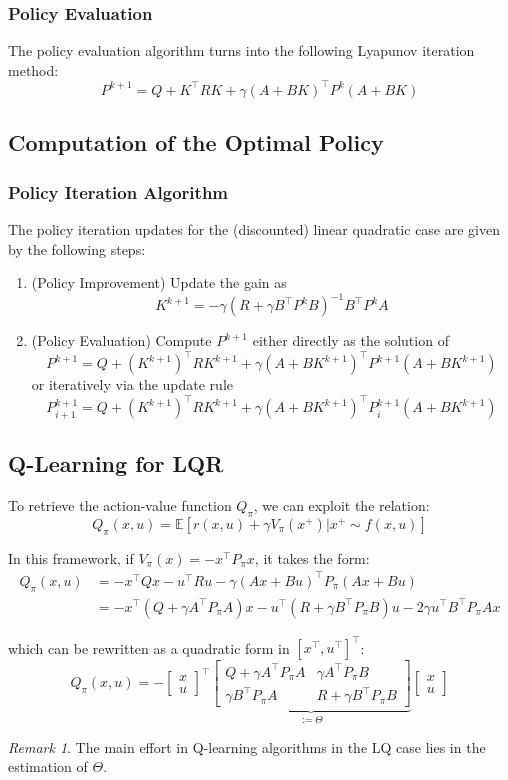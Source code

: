 \documentclass[openany]{book}
\theoremstyle{definition}
\theoremstyle{remark}
\newtheorem*{remark}{Remark}
\begin{document}
\subsubsection{Policy Evaluation}
The policy evaluation algorithm turns into the following Lyapunov iteration method:
\[
    P^{k+1} = Q + K^\top RK + \gamma(A + BK)^\top P^k(A + BK)
\]

\pagebreak
\subsection{Computation of the Optimal Policy}
\subsubsection{Policy Iteration Algorithm}
The policy iteration updates for the (discounted) linear quadratic case are given by the following steps:

\begin{enumerate}
    \item (Policy Improvement) Update the gain as
        \[
            K^{k+1} = -\gamma(R + \gamma B^\top P^k B)^{-1}B^\top P^k A
        \]
    
    \item (Policy Evaluation) Compute $P^{k+1}$ either directly as the solution of
        \[
            P^{k+1} = Q + (K^{k+1})^\top RK^{k+1} + \gamma(A + BK^{k+1})^\top P^{k+1}(A + BK^{k+1})
        \]
        or iteratively via the update rule
        \[
            P_{i+1}^{k+1} = Q + (K^{k+1})^\top RK^{k+1} + \gamma(A + BK^{k+1})^\top P_i^{k+1}(A + BK^{k+1})
        \]
\end{enumerate}

\subsection{Q-Learning for LQR}
To retrieve the action-value function $Q_\pi$, we can exploit the relation:
\[
    Q_\pi(x,u) = \mathbb{E}[r(x,u) + \gamma V_\pi(x^+)|x^+ \sim f(x,u)]
\]

In this framework, if $V_\pi(x) = -x^\top P_\pi x$, it takes the form:
\begin{align*}
    Q_\pi(x,u) &= -x^\top Qx - u^\top Ru - \gamma(Ax + Bu)^\top P_\pi(Ax + Bu) \\
    &= -x^\top(Q + \gamma A^\top P_\pi A)x - u^\top(R + \gamma B^\top P_\pi B)u - 2\gamma u^\top B^\top P_\pi Ax
\end{align*}

which can be rewritten as a quadratic form in $[x^\top, u^\top]^\top$:
\[
    Q_\pi(x,u) = -\begin{bmatrix} x \\ u \end{bmatrix}^\top 
    \underbrace{\begin{bmatrix} 
        Q + \gamma A^\top P_\pi A & \gamma A^\top P_\pi B \\
        \gamma B^\top P_\pi A & R + \gamma B^\top P_\pi B
    \end{bmatrix}}_{:=\Theta}
    \begin{bmatrix} x \\ u \end{bmatrix}
\]

\begin{remark}
The main effort in Q-learning algorithms in the LQ case lies in the estimation of $\Theta$.
\end{remark}
\end{document}
